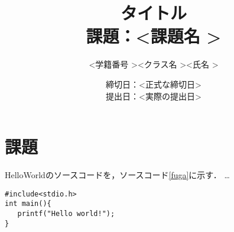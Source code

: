 \documentclass[a4j]{jarticle} %
\title{タイトル\\課題：\textless 課題名 \textgreater}
\author{\textless 学籍番号 \textgreater \textless クラス名 \textgreater \textless 氏名 \textgreater}
\date{締切日：\textless 正式な締切日\textgreater\\提出日：\textless 実際の提出日\textgreater}
\begin{document}
\maketitle

\section{課題}

HelloWorldのソースコードを，ソースコード\ref{fuga}に示す．
…
\begin{lstlisting}[caption=hoge,label=fuga]
#include<stdio.h>
int main(){
   printf("Hello world!");
}
\end{lstlisting}
\end{document}
